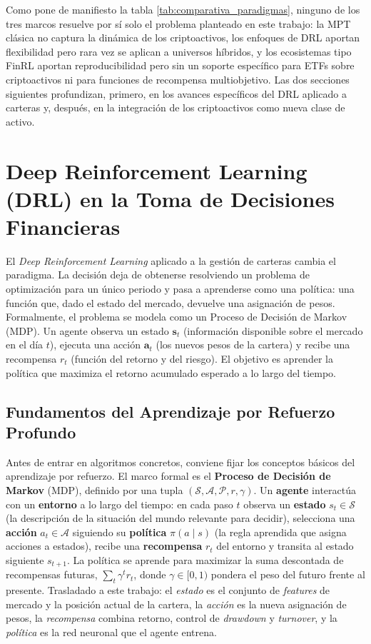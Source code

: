 \documentclass[IB,a4paper]{TFUOC}
\begin{document}
Como pone de manifiesto la tabla \ref{tab:comparativa_paradigmas}, ninguno de los tres marcos resuelve por sí solo el problema planteado en este trabajo: la MPT clásica no captura la dinámica de los criptoactivos, los enfoques de DRL aportan flexibilidad pero rara vez se aplican a universos híbridos, y los ecosistemas tipo FinRL aportan reproducibilidad pero sin un soporte específico para ETFs sobre criptoactivos ni para funciones de recompensa multiobjetivo. Las dos secciones siguientes profundizan, primero, en los avances específicos del DRL aplicado a carteras y, después, en la integración de los criptoactivos como nueva clase de activo.

\section{Deep Reinforcement Learning (DRL) en la Toma de Decisiones Financieras}

El \textit{Deep Reinforcement Learning} aplicado a la gestión de carteras cambia el paradigma. La decisión deja de obtenerse resolviendo un problema de optimización para un único periodo y pasa a aprenderse como una política: una función que, dado el estado del mercado, devuelve una asignación de pesos. Formalmente, el problema se modela como un Proceso de Decisión de Markov (MDP). Un agente observa un estado $\mathbf{s}_t$ (información disponible sobre el mercado en el día $t$), ejecuta una acción $\mathbf{a}_t$ (los nuevos pesos de la cartera) y recibe una recompensa $r_t$ (función del retorno y del riesgo). El objetivo es aprender la política que maximiza el retorno acumulado esperado a lo largo del tiempo.

\subsection{Fundamentos del Aprendizaje por Refuerzo Profundo}
\label{sec:drl_fundamentos}

Antes de entrar en algoritmos concretos, conviene fijar los conceptos básicos del aprendizaje por refuerzo. El marco formal es el \textbf{Proceso de Decisión de Markov} (MDP), definido por una tupla $(\mathcal{S}, \mathcal{A}, \mathcal{P}, r, \gamma)$. Un \textbf{agente} interactúa con un \textbf{entorno} a lo largo del tiempo: en cada paso $t$ observa un \textbf{estado} $s_t \in \mathcal{S}$ (la descripción de la situación del mundo relevante para decidir), selecciona una \textbf{acción} $a_t \in \mathcal{A}$ siguiendo su \textbf{política} $\pi(a \mid s)$ (la regla aprendida que asigna acciones a estados), recibe una \textbf{recompensa} $r_t$ del entorno y transita al estado siguiente $s_{t+1}$. La política se aprende para maximizar la suma descontada de recompensas futuras, $\sum_{t} \gamma^{t} r_t$, donde $\gamma \in [0,1)$ pondera el peso del futuro frente al presente. Trasladado a este trabajo: el \textit{estado} es el conjunto de \textit{features} de mercado y la posición actual de la cartera, la \textit{acción} es la nueva asignación de pesos, la \textit{recompensa} combina retorno, control de \textit{drawdown} y \textit{turnover}, y la \textit{política} es la red neuronal que el agente entrena.
\end{document}
